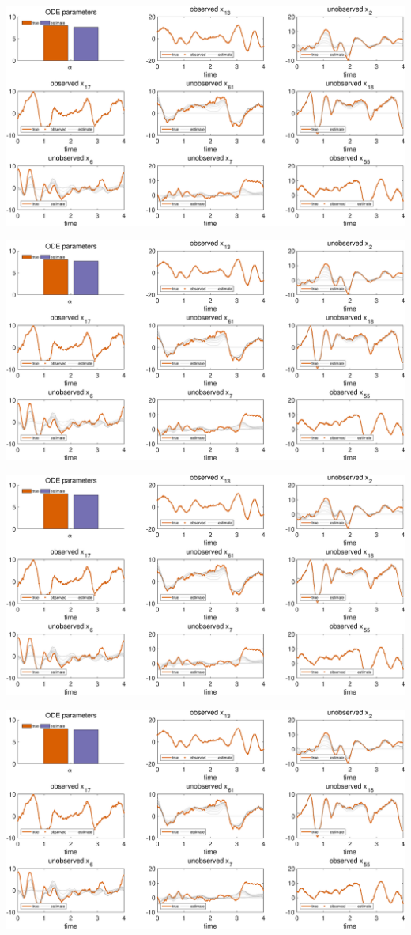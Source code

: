 {\includegraphics [width=5.5in]{VGM_for_Lorenz96_10.eps}

\includegraphics [width=5.5in]{VGM_for_Lorenz96_11.eps}

\includegraphics [width=5.5in]{VGM_for_Lorenz96_12.eps}

\includegraphics [width=5.5in]{VGM_for_Lorenz96_13.eps}

}
